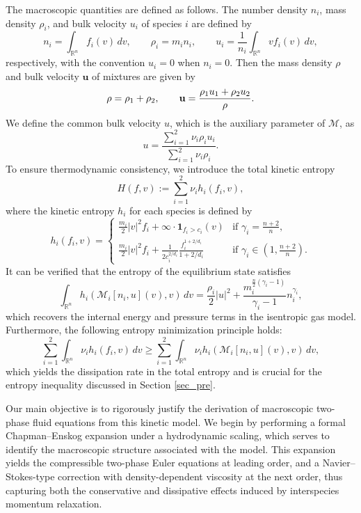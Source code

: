\documentclass[10pt,reqno]{amsart}
\numberwithin{equation}{section}
\newcommand{\R}{\mathbb R}
\begin{document}
The macroscopic quantities are defined as follows. The number density $n_i$, mass density $\rho_i$, and bulk velocity $u_i$ of species $i$ are defined by
\[
n_i = \int_{\mathbb{R}^n} f_i(v)\,dv, \qquad \rho_i=m_in_i,\qquad u_i = \frac{1}{n_i} \int_{\mathbb{R}^n} v f_i(v)\,dv,
\]
respectively, with the convention $u_i = 0$ when $n_i = 0$. Then the mass density $\rho$ and bulk velocity $\mathbf{u}$ of mixtures are given by 
\begin{equation}\label{total} 
 \rho=\rho_1+\rho_2,\qquad {\bf{u}}=\frac{\rho_1u_1+\rho_2u_2}{\rho}.
\end{equation}
We define the common bulk velocity $u$, which is the auxiliary parameter of $\mathcal{M}$, as
\[
u=\frac{\sum_{i=1}^2  \nu_i \rho_i u_i}{\sum_{i=1}^2 \nu_i \rho_i}.
\]
To ensure thermodynamic consistency, we introduce the total kinetic entropy
\[
H(f,v) := \sum_{i=1}^2 \nu_i h_i(f_i,v),
\]
where the kinetic entropy $h_i$ for each species is defined by
\[
h_i(f_i,v) =
\begin{cases}
\displaystyle \frac{m_i}{2} |v|^2 f_i + \infty \cdot \mathbf{1}_{f_i > c_i}(v) & \text{if } \gamma_i = \frac{n+2}{n}, \\[2mm]
\displaystyle \frac{m_i}{2} |v|^2 f_i + \frac{1}{2c_i^{2/d_i}} \frac{f_i^{1+2/d_i}}{1+2/d_i} & \text{if } \gamma_i \in \left(1, \frac{n+2}{n} \right).
\end{cases}
\]
It can be verified that the entropy of the equilibrium state satisfies
\[
\int_{\mathbb{R}^n} h_i(\mathcal{M}_i[n_i, u](v), v)\,dv = \frac{\rho_i}{2}  |u|^2 + \frac{m_i^{\frac{n}{2}(\gamma_i - 1)}}{\gamma_i - 1} n_i^{\gamma_i},
\]
which recovers the internal energy and pressure terms in the isentropic gas model. Furthermore, the following entropy minimization principle holds:
\[
\sum_{i=1}^2 \int_{\R^n}  \nu_i h_i(f_i,v)\,dv \geq \sum_{i=1}^2 \int_{\mathbb{R}^n} \nu_i h_i(\mathcal{M}_i[n_i, u](v), v)\,dv,
\]
which yields the dissipation rate in the total entropy and is crucial for the entropy inequality discussed in Section \ref{sec_pre}. 


 Our main objective is to rigorously justify the derivation of macroscopic two-phase fluid equations from this kinetic model. We begin by performing a formal Chapman--Enskog expansion under a hydrodynamic scaling, which serves to identify the macroscopic structure associated with the model. This expansion yields the compressible two-phase Euler equations at leading order, and a Navier--Stokes-type correction with density-dependent viscosity at the next order, thus capturing both the conservative and dissipative effects induced by interspecies momentum relaxation.
\end{document}
